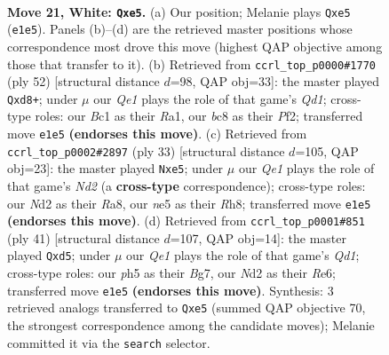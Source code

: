 \documentclass[11pt]{article}
\begin{document}
\clearpage

\begin{figure}[p]\centering
\begin{subfigure}{0.46\textwidth}\centering
\resizebox{\linewidth}{!}{%
\newchessgame
\chessboard[
  setfen={2b2rk1/2p2p2/5rp1/pB2n2p/2P4P/3q4/PP1N2P1/R1B1Q2K w - - 0 21},
  showmover=false,
  pgfstyle=straightmove, color=movearrow, markmove={e1-e5}
]}
\caption{}
\end{subfigure}\hfill
\begin{subfigure}{0.46\textwidth}\centering
\resizebox{\linewidth}{!}{%
\newchessgame
\chessboard[
  setfen={2nr2k1/4ppb1/2r3p1/p6p/Nq6/1P2B1PP/1P3P2/R2Q2K1 w - - 0 27},
  showmover=false,
  pgfstyle=straightmove, color=movearrow, markmove={d1-d8}
]}
\caption{}
\end{subfigure}
\\[4pt]
\begin{subfigure}{0.46\textwidth}\centering
\resizebox{\linewidth}{!}{%
\newchessgame
\chessboard[
  setfen={r3kb1r/q2n1pp1/p3p2p/P1p1P3/8/5Q2/1P3PPP/RNB2RK1 b kq - 0 17},
  showmover=false,
  pgfstyle=straightmove, color=movearrow, markmove={d7-e5}
]}
\caption{}
\end{subfigure}\hfill
\begin{subfigure}{0.46\textwidth}\centering
\resizebox{\linewidth}{!}{%
\newchessgame
\chessboard[
  setfen={3q2k1/p4pb1/b3r1p1/3P2p1/8/3p1PN1/PP1Q2PP/R4R1K b - - 0 21},
  showmover=false,
  pgfstyle=straightmove, color=movearrow, markmove={d8-d5}
]}
\caption{}
\end{subfigure}
\caption{\textbf{Move 21, White: \texttt{Qxe5}.} (a) Our position; Melanie plays \texttt{Qxe5} (\texttt{e1e5}). Panels (b)--(d) are the retrieved master positions whose correspondence most drove this move (highest QAP objective among those that transfer to it). (b) Retrieved from \texttt{ccrl\_top\_p0000\#1770} (ply 52) [structural distance $d$=98, QAP obj=33]: the master played \texttt{Qxd8+}; under $\mu$ our \emph{Qe1} plays the role of that game's \emph{Qd1}; cross-type roles: our \emph{B}c1 as their \emph{R}a1, our \emph{b}c8 as their \emph{P}f2; transferred move \texttt{e1e5} \textbf{(endorses this move)}. (c) Retrieved from \texttt{ccrl\_top\_p0002\#2897} (ply 33) [structural distance $d$=105, QAP obj=23]: the master played \texttt{Nxe5}; under $\mu$ our \emph{Qe1} plays the role of that game's \emph{Nd2} (a \textbf{cross-type} correspondence); cross-type roles: our \emph{N}d2 as their \emph{R}a8, our \emph{n}e5 as their \emph{R}h8; transferred move \texttt{e1e5} \textbf{(endorses this move)}. (d) Retrieved from \texttt{ccrl\_top\_p0001\#851} (ply 41) [structural distance $d$=107, QAP obj=14]: the master played \texttt{Qxd5}; under $\mu$ our \emph{Qe1} plays the role of that game's \emph{Qd1}; cross-type roles: our \emph{p}h5 as their \emph{B}g7, our \emph{N}d2 as their \emph{R}e6; transferred move \texttt{e1e5} \textbf{(endorses this move)}. Synthesis: 3 retrieved analogs transferred to \texttt{Qxe5} (summed QAP objective 70, the strongest correspondence among the candidate moves); Melanie committed it via the \texttt{search} selector.}
\label{fig:thought-m40}
\end{figure}
\end{document}
